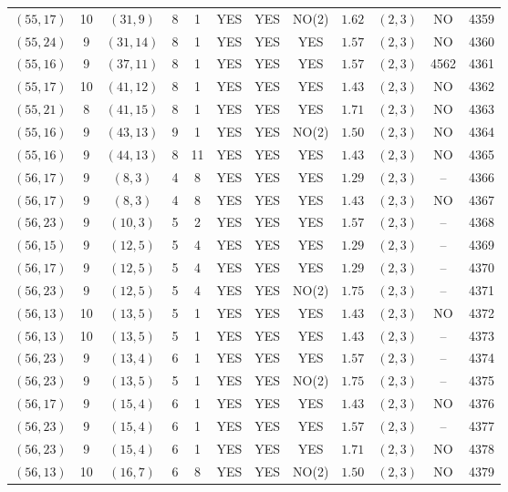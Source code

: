 \begin{longtable}{|c|c|c|c|c|c|c|c|c|c|c|c|}
$(55,17)$ & 10 & $(31,9)$ & 8 & 1 & YES & YES & NO(2) & $1.62$ & $(2,3)$ & NO & 4359\\
$(55,24)$ & 9 & $(31,14)$ & 8 & 1 & YES & YES & YES & $1.57$ & $(2,3)$ & NO & 4360\\
$(55,16)$ & 9 & $(37,11)$ & 8 & 1 & YES & YES & YES & $1.57$ & $(2,3)$ & 4562 & 4361\\
$(55,17)$ & 10 & $(41,12)$ & 8 & 1 & YES & YES & YES & $1.43$ & $(2,3)$ & NO & 4362\\
$(55,21)$ & 8 & $(41,15)$ & 8 & 1 & YES & YES & YES & $1.71$ & $(2,3)$ & NO & 4363\\
$(55,16)$ & 9 & $(43,13)$ & 9 & 1 & YES & YES & NO(2) & $1.50$ & $(2,3)$ & NO & 4364\\
$(55,16)$ & 9 & $(44,13)$ & 8 & 11 & YES & YES & YES & $1.43$ & $(2,3)$ & NO & 4365\\
$(56,17)$ & 9 & $(8,3)$ & 4 & 8 & YES & YES & YES & $1.29$ & $(2,3)$ & -- & 4366\\
$(56,17)$ & 9 & $(8,3)$ & 4 & 8 & YES & YES & YES & $1.43$ & $(2,3)$ & NO & 4367\\
$(56,23)$ & 9 & $(10,3)$ & 5 & 2 & YES & YES & YES & $1.57$ & $(2,3)$ & -- & 4368\\
$(56,15)$ & 9 & $(12,5)$ & 5 & 4 & YES & YES & YES & $1.29$ & $(2,3)$ & -- & 4369\\
$(56,17)$ & 9 & $(12,5)$ & 5 & 4 & YES & YES & YES & $1.29$ & $(2,3)$ & -- & 4370\\
$(56,23)$ & 9 & $(12,5)$ & 5 & 4 & YES & YES & NO(2) & $1.75$ & $(2,3)$ & -- & 4371\\
$(56,13)$ & 10 & $(13,5)$ & 5 & 1 & YES & YES & YES & $1.43$ & $(2,3)$ & NO & 4372\\
$(56,13)$ & 10 & $(13,5)$ & 5 & 1 & YES & YES & YES & $1.43$ & $(2,3)$ & -- & 4373\\
$(56,23)$ & 9 & $(13,4)$ & 6 & 1 & YES & YES & YES & $1.57$ & $(2,3)$ & -- & 4374\\
$(56,23)$ & 9 & $(13,5)$ & 5 & 1 & YES & YES & NO(2) & $1.75$ & $(2,3)$ & -- & 4375\\
$(56,17)$ & 9 & $(15,4)$ & 6 & 1 & YES & YES & YES & $1.43$ & $(2,3)$ & NO & 4376\\
$(56,23)$ & 9 & $(15,4)$ & 6 & 1 & YES & YES & YES & $1.57$ & $(2,3)$ & -- & 4377\\
$(56,23)$ & 9 & $(15,4)$ & 6 & 1 & YES & YES & YES & $1.71$ & $(2,3)$ & NO & 4378\\
$(56,13)$ & 10 & $(16,7)$ & 6 & 8 & YES & YES & NO(2) & $1.50$ & $(2,3)$ & NO & 4379\\

\end{longtable}
